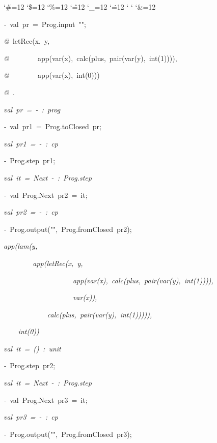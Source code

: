 \begin{list}{}
{\setlength{\leftmargin}{\leftmargini}
\setlength{\rightmargin}{0cm}
\setlength{\itemindent}{0cm}
\setlength{\listparindent}{0cm}
\setlength{\itemsep}{0cm}
\setlength{\parsep}{0cm}
\setlength{\labelsep}{0cm}
\setlength{\labelwidth}{0cm}
\catcode`\#=12
\catcode`\$=12
\catcode`\%=12
\catcode`\^=12
\catcode`\_=12
\catcode`\.=12
\catcode`
\catcode`
\catcode`\&=12
\ttfamily}
\small
\item[]\textsl{-\ }val\ pr\ =\ Prog.input\ "";
\item[]\textsl{@\ }letRec(x,\ y,
\item[]\textsl{@\ }\ \ \ \ \ \ \ app(var(x),\ calc(plus,\ pair(var(y),\ int(1)))),
\item[]\textsl{@\ }\ \ \ \ \ \ \ app(var(x),\ int(0)))
\item[]\textsl{@\ }.
\item[]\textsl{val\ pr\ =\ -\ :\ prog}
\item[]\textsl{-\ }val\ pr1\ =\ Prog.toClosed\ pr;
\item[]\textsl{val\ pr1\ =\ -\ :\ cp}
\item[]\textsl{-\ }Prog.step\ pr1;
\item[]\textsl{val\ it\ =\ Next\ -\ :\ Prog.step}
\item[]\textsl{-\ }val\ Prog.Next\ pr2\ =\ it;
\item[]\textsl{val\ pr2\ =\ -\ :\ cp}
\item[]\textsl{-\ }Prog.output("",\ Prog.fromClosed\ pr2);
\item[]\textsl{app(lam(y,}
\item[]\textsl{\ \ \ \ \ \ \ \ app(letRec(x,\ y,}
\item[]\textsl{\ \ \ \ \ \ \ \ \ \ \ \ \ \ \ \ \ \ \ app(var(x),\ calc(plus,\ pair(var(y),\ int(1)))),}
\item[]\textsl{\ \ \ \ \ \ \ \ \ \ \ \ \ \ \ \ \ \ \ var(x)),}
\item[]\textsl{\ \ \ \ \ \ \ \ \ \ \ \ calc(plus,\ pair(var(y),\ int(1))))),}
\item[]\textsl{\ \ \ \ int(0))}
\item[]\textsl{val\ it\ =\ ()\ :\ unit}
\item[]\textsl{-\ }Prog.step\ pr2;
\item[]\textsl{val\ it\ =\ Next\ -\ :\ Prog.step}
\item[]\textsl{-\ }val\ Prog.Next\ pr3\ =\ it;
\item[]\textsl{val\ pr3\ =\ -\ :\ cp}
\item[]\textsl{-\ }Prog.output("",\ Prog.fromClosed\ pr3);

\end{list}
